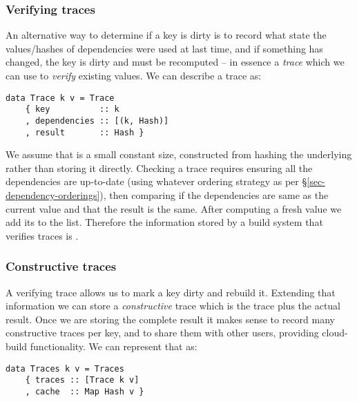 \subsubsection{Verifying traces}\label{sec-verifying-traces}

An alternative way to determine if a key is dirty is to record what state the
values/hashes of dependencies were used at last time, and if something has
changed, the key is dirty and must be recomputed -- in essence a \emph{trace}
which we can use to \textit{verify} existing values. We can describe a trace as:


\begin{verbatim}
data Trace k v = Trace
    { key          :: k
    , dependencies :: [(k, Hash)]
    , result       :: Hash }
\end{verbatim}

We assume that  is a small constant size, constructed from hashing the
underlying  rather than storing it directly. Checking a trace requires
ensuring all the dependencies are up-to-date (using whatever ordering strategy
as per \S\ref{sec-dependency-orderings}), then comparing if the dependencies are
same as the current value and that the result is the same. After computing a
fresh value we add its  to the list. Therefore the information stored
by a build system that verifies traces is \hs{[Trace k v]}.

\subsubsection{Constructive traces}\label{sec-constructive-traces}

A verifying trace allows us to mark a key dirty and rebuild it. Extending that information we can store a \textit{constructive} trace which is the trace plus the actual result. Once we are storing the complete result it makes sense to record many constructive traces per key, and to share them with other users, providing cloud-build functionality. We can represent that as:


\begin{verbatim}
data Traces k v = Traces
    { traces :: [Trace k v]
    , cache  :: Map Hash v }
\end{verbatim}


